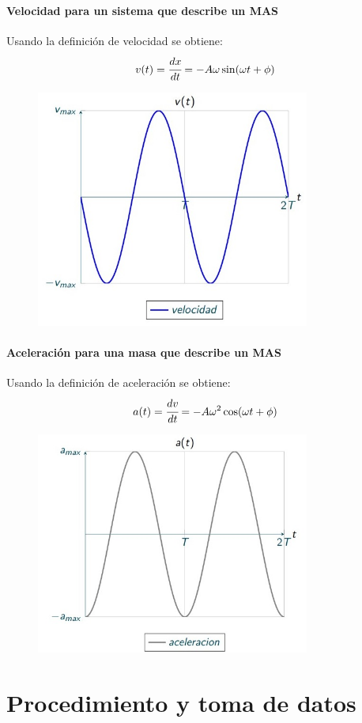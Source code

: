 \paragraph{Velocidad para un sistema que describe un MAS}
Usando la definición de velocidad se obtiene:
\[v(t)=\cfrac{dx}{dt}=-A\omega \sin (\omega t+\phi)\]
\begin{figure}[H]
	\centering
	\includegraphics[width=9cm]{Images/min_ii.jpeg}
\end{figure}
\paragraph{Aceleración para una masa que describe un MAS}
Usando la definición de aceleración se obtiene:
\[a(t)=\cfrac{dv}{dt}=-A\omega^2 \cos (\omega t+\phi)\]
\begin{figure}[H]
	\centering
	\includegraphics[width=9cm]{Images/min_iii.jpeg}
\end{figure}
\section{Procedimiento y toma de datos}
